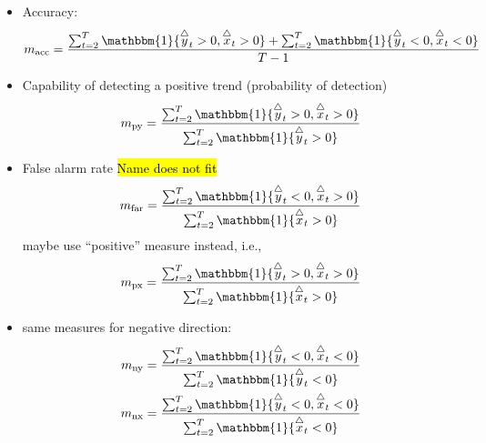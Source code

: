 \documentclass[oneside]{article}
\theoremstyle{plain}%
\theoremstyle{definition}
\newcommand{\ind}[1]{\mathbbm{1}\{#1\}}
\newcommand{\ydiff}{\overset{\triangle}{y}}
\newcommand{\xdiff}{\overset{\triangle}{x}}
\begin{document}
\begin{itemize}
  \item Accuracy: \begin{equation}
  	m_{\text{acc}} = \frac{\sum_{t=2}^T \ind{\ydiff_t > 0, \xdiff_t > 0} + \sum_{t=2}^T \ind{\ydiff_t < 0, \xdiff_t < 0}}{T-1}
\end{equation}
	\item Capability of detecting a positive trend (probability of detection)
	\begin{equation}
  		m_{\text{py}} = \frac{\sum_{t=2}^T \ind{\ydiff_t > 0, \xdiff_t > 0}}{\sum_{t=2}^T \ind{\ydiff_t > 0}}
	\end{equation}
	\item False alarm rate \hl{Name does not fit} \begin{equation}
  m_{\text{far}} = \frac{\sum_{t=2}^T \ind{\ydiff_t < 0, \xdiff_t > 0}}{\sum_{t=2}^T \ind{\xdiff_t > 0}}
\end{equation}
maybe use \enquote{positive} measure instead, i.e.,
\begin{equation}
  m_{\text{px}} = \frac{\sum_{t=2}^T \ind{\ydiff_t > 0, \xdiff_t > 0}}{\sum_{t=2}^T \ind{\xdiff_t > 0}}  
\end{equation}
	\item same measures for negative direction:
	\begin{align}
		m_{\text{ny}} &=  \frac{\sum_{t=2}^T \ind{\ydiff_t < 0, \xdiff_t < 0}}{\sum_{t=2}^T \ind{\ydiff_t < 0}} \\
		m_{\text{nx}} &=  \frac{\sum_{t=2}^T \ind{\ydiff_t < 0, \xdiff_t < 0}}{\sum_{t=2}^T \ind{\xdiff_t < 0}}
	\end{align}
\end{itemize}
\end{document}
